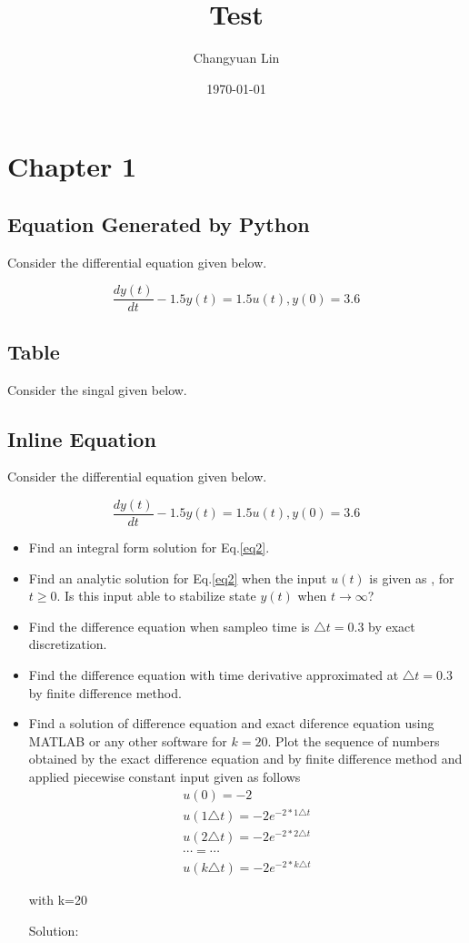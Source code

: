 \documentclass[11pt]{article}
\author{Changyuan Lin}
\date{\today}
\title{Test}
\newcommand{\aDE}[4]{\begin{center}\begin{equation}\label{#4}\frac{{dy(t)}}{{dt}} -#1y(t) = #2u(t),y(0) = #3 \end{equation}\end{center}}
\begin{document}
\maketitle
\tableofcontents

\section{Chapter 1}
\label{sec-1}
\subsection{Equation Generated by Python}
\label{sec-1-1}
Consider the differential equation given below.
\aDE{1.5}{1.5}{3.6}{eq1}
\subsection{Table}
\label{sec-1-2}
Consider the singal given below.

\url{}

\subsection{Inline Equation}
\label{sec-1-3}
Consider the differential equation given below.
\aDE{1.5}{1.5}{3.6}{eq2}
\begin{itemize}
\item Find an integral form solution for Eq.\ref{eq2}.
\item Find an analytic solution for Eq.\ref{eq2} when the input \(u(t)\) is  given as , for \(t\ge 0\). Is this input able to stabilize state \(y(t)\) when \( t\rightarrow  \infty\)?
\item Find the difference equation when sampleo time is \(\triangle t=0.3\) by exact discretization.
\item Find the difference equation with time derivative approximated at \(\triangle t=0.3\) by finite difference method.
\item Find a solution of difference equation and exact diference equation using  MATLAB or any other software for \(k=20\).  Plot the sequence of numbers obtained by the exact difference equation and by finite difference method and applied piecewise constant input given as follows
\[ \begin{array}{c} u(0) = -2 \\u(1\triangle t) = -2e^{-2*1\triangle t} \\ u(2\triangle t) = -2e^{-2*2\triangle t} \\ \cdots=\cdots \\ u(k\triangle t)= -2e^{-2*k\triangle t}\end{array} \]

with k=20

Solution:
\end{itemize}
\end{document}
